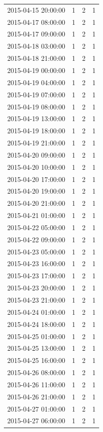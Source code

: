 \begin{tabular}{lrrr}
2015-04-15 20:00:00 & 1 & 2 & 1 \\
2015-04-17 08:00:00 & 1 & 2 & 1 \\
2015-04-17 09:00:00 & 1 & 2 & 1 \\
2015-04-18 03:00:00 & 1 & 2 & 1 \\
2015-04-18 21:00:00 & 1 & 2 & 1 \\
2015-04-19 00:00:00 & 1 & 2 & 1 \\
2015-04-19 04:00:00 & 1 & 2 & 1 \\
2015-04-19 07:00:00 & 1 & 2 & 1 \\
2015-04-19 08:00:00 & 1 & 2 & 1 \\
2015-04-19 13:00:00 & 1 & 2 & 1 \\
2015-04-19 18:00:00 & 1 & 2 & 1 \\
2015-04-19 21:00:00 & 1 & 2 & 1 \\
2015-04-20 09:00:00 & 1 & 2 & 1 \\
2015-04-20 10:00:00 & 1 & 2 & 1 \\
2015-04-20 17:00:00 & 1 & 2 & 1 \\
2015-04-20 19:00:00 & 1 & 2 & 1 \\
2015-04-20 21:00:00 & 1 & 2 & 1 \\
2015-04-21 01:00:00 & 1 & 2 & 1 \\
2015-04-22 05:00:00 & 1 & 2 & 1 \\
2015-04-22 09:00:00 & 1 & 2 & 1 \\
2015-04-23 05:00:00 & 1 & 2 & 1 \\
2015-04-23 16:00:00 & 1 & 2 & 1 \\
2015-04-23 17:00:00 & 1 & 2 & 1 \\
2015-04-23 20:00:00 & 1 & 2 & 1 \\
2015-04-23 21:00:00 & 1 & 2 & 1 \\
2015-04-24 01:00:00 & 1 & 2 & 1 \\
2015-04-24 18:00:00 & 1 & 2 & 1 \\
2015-04-25 01:00:00 & 1 & 2 & 1 \\
2015-04-25 13:00:00 & 1 & 2 & 1 \\
2015-04-25 16:00:00 & 1 & 2 & 1 \\
2015-04-26 08:00:00 & 1 & 2 & 1 \\
2015-04-26 11:00:00 & 1 & 2 & 1 \\
2015-04-26 21:00:00 & 1 & 2 & 1 \\
2015-04-27 01:00:00 & 1 & 2 & 1 \\
2015-04-27 06:00:00 & 1 & 2 & 1 \\

\end{tabular}
